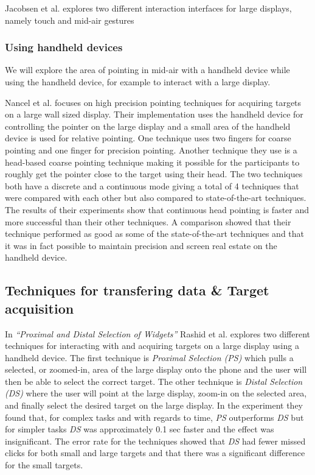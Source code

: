 Jacobsen et al. explores two different interaction interfaces for large displays, namely touch and mid-air gestures


\subsubsection{Using handheld devices} \label{sec:midAirPointingHandheld}
We will explore the area of pointing in mid-air with a handheld device while using the handheld device, for example to interact with a large display.

Nancel et al. \cite{Nancel:2013} focuses on high precision pointing techniques for acquiring targets on a large wall sized display.
Their implementation uses the handheld device for controlling the pointer on the large display and a small area of the handheld device is used for relative pointing.
One technique uses two fingers for coarse pointing and one finger for precision pointing. 
Another technique they use is a head-based coarse pointing technique making it possible for the participants to roughly get the pointer close to the target using their head.
The two techniques both have a discrete and a continuous mode giving a total of 4 techniques that  were compared with each other but also compared to state-of-the-art techniques.
The results of their experiments show that continuous head pointing is faster and more successful than their other techniques.
A comparison showed that their technique performed as good as some of the state-of-the-art techniques and that it was in fact possible to maintain precision and screen real estate on the handheld device.

\subsection{Techniques for transfering data \& Target acquisition} \label{sec:targetAcquisition}
In \emph{``Proximal and Distal Selection of Widgets''} Rashid et al. \cite{Rashid:2011} explores two different techniques for interacting with and acquiring targets on a large display using a handheld device.
The first technique is \emph{Proximal Selection (PS)} which pulls a selected, or zoomed-in, area of the large display onto the phone and the user will then be able to select the correct target.
The other technique is \emph{Distal Selection (DS)} where the user will point at the large display, zoom-in on the selected area, and finally select the desired target on the large display.
In the experiment they found that, for complex tasks and with regards to time, \emph{PS} outperforms \emph{DS} but for simpler tasks \emph{DS} was approximately 0.1 sec faster and the effect was insignificant.
The error rate for the techniques showed that \emph{DS} had fewer missed clicks for both small and large targets and that there was a significant difference for the small targets.

